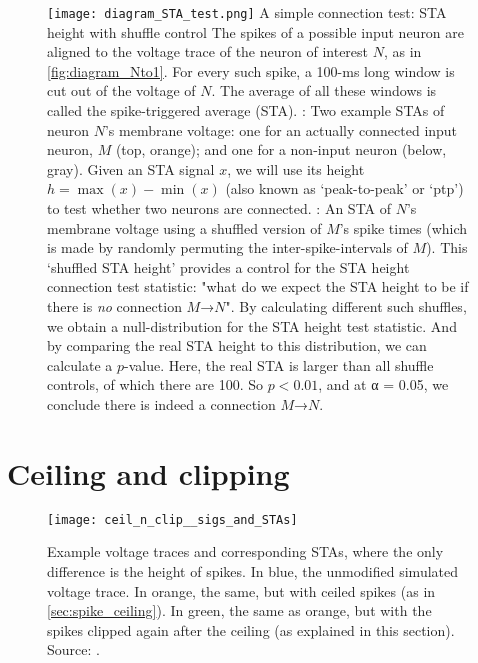 \begin{figure}
    \hspace{-5em}
    \texttt{[image: diagram\_STA\_test.png]}
    \captionn
        {A simple connection test: STA height with shuffle control}
        {The spikes of a possible input neuron are aligned to the voltage trace of the neuron of interest $N$, as in \cref{fig:diagram_Nto1}. For every such spike, a 100-ms long window is cut out of the voltage of $N$. The average of all these windows is called the spike-triggered average (STA).\newline
        \Left: Two example STAs of neuron $N$'s membrane voltage: one for an actually connected input neuron, $M$ (top, orange); and one for a non-input neuron (below, gray).
        Given an STA signal $x$, we will use its height $h = \max(x) - \min(x)$ (also known as `peak-to-peak' or `ptp') to test whether two neurons are connected. \newline
        \Right: An STA of $N$'s membrane voltage using a shuffled version of $M$'s spike times (which is made by randomly permuting the inter-spike-intervals of $M$). This `shuffled STA height' provides a control for the STA height connection test statistic: "what do we expect the STA height to be if there is \emph{no} connection $M$→$N$".
        By calculating different such shuffles, we obtain a null-distribution for the STA height test statistic. And by comparing the real STA height to this distribution, we can calculate a $p$-value. Here, the real STA is larger than all shuffle controls, of which there are 100. So $p < 0.01$, and at α = 0.05, we conclude there is indeed a connection $M$→$N$.}
    \label{fig:STA-height-suffle}
\end{figure}



\FloatBarrier
\section{Ceiling and clipping}
\label{sec:ceil-n-clip}

\begin{figure}
    \texttt{[image: ceil\_n\_clip\_\_sigs\_and\_STAs]}
    \caption
        {Example voltage traces and corresponding STAs, where the only difference is the height of spikes. In blue, the unmodified simulated voltage trace. In orange, the same, but with ceiled spikes (as in \cref{sec:spike_ceiling}). In green, the same as orange, but with the spikes clipped again after the ceiling (as explained in this section).\\
        Source: .}
    \label{fig:ceil_n_clip__sigs_and_STAs}
\end{figure}

